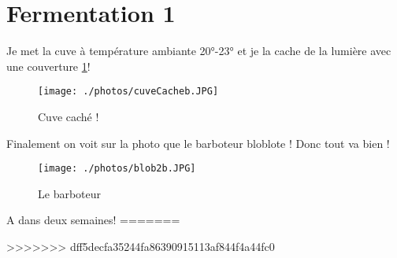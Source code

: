 \documentclass[twoside,twocolumn]{report}
\begin{document}
		\section{Fermentation 1}
			Je met la cuve à température ambiante 20°-23° et je la cache de la lumière avec une couverture  \ref{cuvec}!\\
			\begin{figure}[h!]
				\centering
				\texttt{[image: ./photos/cuveCacheb.JPG]}
				\caption{Cuve caché !}
				\label{cuvec}
			\end{figure}
			Finalement on voit sur la photo que le barboteur bloblote ! Donc tout va bien !
			 \begin{figure}[h!]
			 	\centering
			 	\texttt{[image: ./photos/blob2b.JPG]}
			 	\caption{Le barboteur}
			 	\label{blob}
			 \end{figure}
			A dans deux semaines!
=======
				 
>>>>>>> dff5decfa35244fa86390915113af844f4a44fc0
				 
				 
				 
				 
				 
				 
				 
				 
				 
				
				
				
				
			

			
				
						
		
 

	
\end{document}
